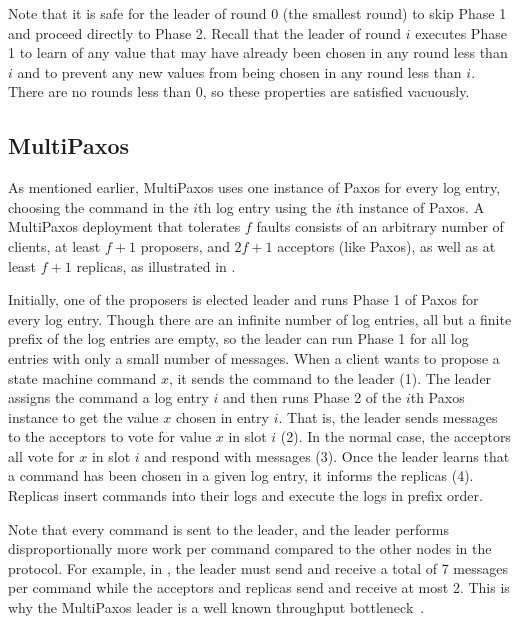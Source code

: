 Note that it is safe for the leader of round $0$ (the smallest round) to skip
Phase 1 and proceed directly to Phase 2. Recall that the leader of round $i$
executes Phase 1 to learn of any value that may have already been chosen in any
round less than $i$ and to prevent any new values from being chosen in any
round less than $i$. There are no rounds less than $0$, so these properties are
satisfied vacuously.

\subsection{MultiPaxos}
As mentioned earlier, MultiPaxos uses one instance of Paxos for every log
entry, choosing the command in the $i$th log entry using the $i$th instance of
Paxos.  A MultiPaxos deployment that tolerates $f$ faults consists of an
arbitrary number of clients, at least $f+1$ proposers, and $2f+1$ acceptors
(like Paxos), as well as at least $f+1$ replicas, as illustrated in
.

{}

Initially, one of the proposers is elected leader and runs Phase 1 of Paxos for
every log entry. Though there are an infinite number of log entries, all but a
finite prefix of the log entries are empty, so the leader can run Phase 1 for
all log entries with only a small number of messages.
%
When a client wants to propose a state machine command
$x$, it sends the command to the leader (1). The leader assigns the command a
log entry $i$ and then runs Phase 2 of the $i$th Paxos instance to get the
value $x$ chosen in entry $i$. That is, the leader sends 
messages to the acceptors to vote for value $x$ in slot $i$ (2). In the normal
case, the acceptors all vote for $x$ in slot $i$ and respond with
 messages (3). Once the leader learns that a command has
been chosen in a given log entry, it informs the replicas (4). Replicas insert
commands into their logs and execute the logs in prefix order.

Note that every command is sent to the leader, and the leader performs
disproportionally more work per command compared to the other nodes in the
protocol. For example, in , the leader must send and receive
a total of 7 messages per command while the acceptors and replicas send and
receive at most 2. This is why the MultiPaxos leader is a well known throughput
bottleneck~\cite{mao2008mencius, moraru2013there}.
